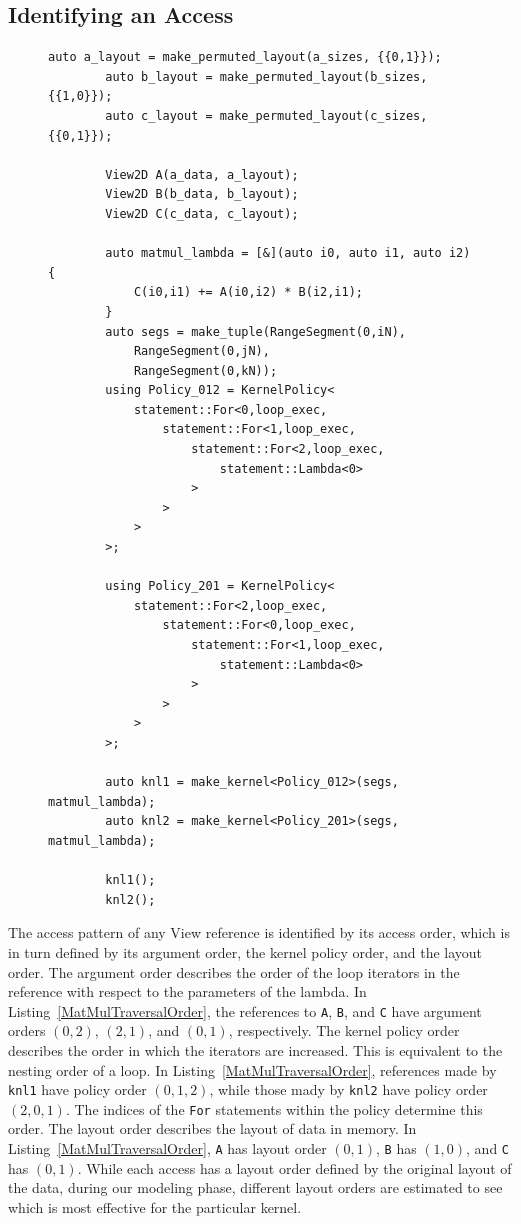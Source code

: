 \documentclass[sigconf, table]{acmart}
\begin{document}
\subsection{Identifying an Access}
\begin{figure}
	\begin{lstlisting}[caption={Two implementations of matrix multiplication using different kernel policies.},
		label={MatMulTraversalOrder}]
		auto a_layout = make_permuted_layout(a_sizes, {{0,1}});
		auto b_layout = make_permuted_layout(b_sizes, {{1,0}});
		auto c_layout = make_permuted_layout(c_sizes, {{0,1}});

		View2D A(a_data, a_layout);
		View2D B(b_data, b_layout);
		View2D C(c_data, c_layout);

		auto matmul_lambda = [&](auto i0, auto i1, auto i2) {
			C(i0,i1) += A(i0,i2) * B(i2,i1);
		}
		auto segs = make_tuple(RangeSegment(0,iN), 
			RangeSegment(0,jN), 
			RangeSegment(0,kN));
		using Policy_012 = KernelPolicy<
			statement::For<0,loop_exec,
				statement::For<1,loop_exec,
					statement::For<2,loop_exec,
						statement::Lambda<0>
					>
				>
			>
		>;

		using Policy_201 = KernelPolicy<
			statement::For<2,loop_exec,
				statement::For<0,loop_exec,
					statement::For<1,loop_exec,
						statement::Lambda<0>
					>
				>
			>
		>;

		auto knl1 = make_kernel<Policy_012>(segs, matmul_lambda);
		auto knl2 = make_kernel<Policy_201>(segs, matmul_lambda);

		knl1();
		knl2();
	\end{lstlisting}
\end{figure}
The access pattern of any View reference is identified by its access order, which is in turn defined by its argument order, the kernel policy order, and the layout order. 
The argument order describes the order of the loop iterators in the reference with respect to the parameters of the lambda. 
In Listing~\ref{MatMulTraversalOrder}, the references to \verb.A., \verb.B., and \verb.C. have argument orders $(0,2)$, $(2,1)$, and $(0,1)$, respectively. 
The kernel policy order describes the order in which the iterators are increased. 
This is equivalent to the nesting order of a loop.
In Listing~\ref{MatMulTraversalOrder}, references made by \verb.knl1. have policy order $(0,1,2)$, while those mady by \verb.knl2. have policy order $(2,0,1)$.
The indices of the \verb.For. statements within the policy determine this order.
The layout order describes the layout of data in memory. 
In Listing~\ref{MatMulTraversalOrder}, \verb.A. has layout order $(0,1)$, \verb.B. has $(1,0)$, and \verb.C. has $(0,1)$.
While each access has a layout order defined by the original layout of the data, during our modeling phase, different layout orders are estimated to see which is most effective for the particular kernel. 
\end{document}
